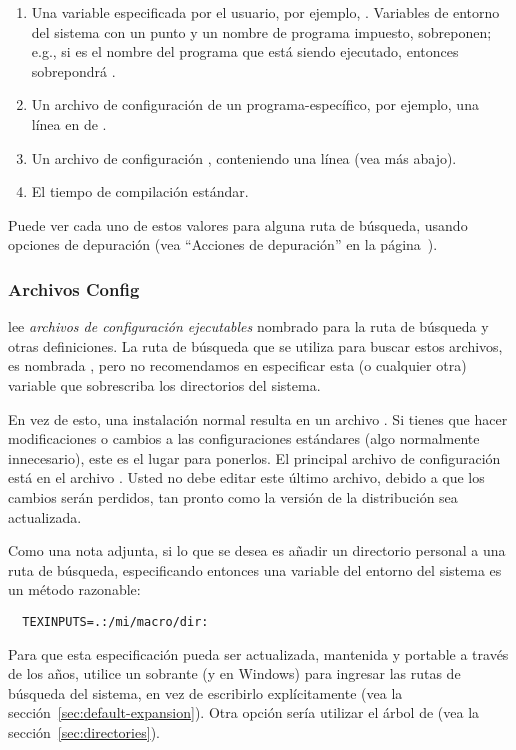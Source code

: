 \documentclass{article}
\begin{document}
\begin{enumerate}
	\item
		Una variable especificada por el usuario, por
		ejemplo, \@. Variables de
		entorno del sistema con un punto y un nombre
		de programa impuesto, sobreponen; e.g., si
		 es el nombre del programa que
		está siendo ejecutado, entonces
		 sobrepondrá
		.
	\item
		Un archivo de configuración de un
		programa-específico, por ejem\-plo, una línea
		 en  de
		. 
	\item 
		Un archivo de configuración \KPS{}
		, conteniendo una línea
		 (vea más abajo).
	\item
		El tiempo de compilación estándar. 
\end{enumerate}
\noindent Puede ver cada uno de estos valores para alguna ruta
de búsqueda, usando opciones de depuración (vea ``Acciones de
depuración'' en la página~\pageref{sec:debugging}).

\subsubsection{Archivos Config}

\KPS{} lee \emph{archivos de configuración ejecutables} nombrado
 para la ruta de búsqueda y otras definiciones. La ruta
de búsqueda que se utiliza para buscar estos archivos, es nombrada
, pero no recomendamos en especificar esta (o
cualquier otra) variable que sobrescriba los directorios del sistema. 

En vez de esto, una instalación normal resulta en un archivo
. Si tienes que hacer modificaciones o
cambios a las configuraciones estándares (algo normalmente
innecesario), este es el lugar para ponerlos. El principal archivo de
configuración está en el archivo
.  Usted no debe editar este
último archivo, debido a que los cambios serán perdidos, tan pronto
como la versión de la distribución sea actualizada. 

Como una nota adjunta, si lo que se desea es añadir un directorio personal a una ruta de búsqueda, especificando entonces una variable del entorno del sistema es un método razonable:
\begin{verbatim}
  TEXINPUTS=.:/mi/macro/dir:
\end{verbatim}
Para que esta especificación pueda ser actualizada, mantenida y portable a través de los años, utilice un sobrante \samp{:} (y \samp{;} en Windows) para ingresar las rutas de búsqueda del sistema, en vez de escribirlo explícitamente (vea la sección~\ref{sec:default-expansion}). Otra opción sería utilizar el árbol de  (vea la sección~\ref{sec:directories}).
\end{document}
